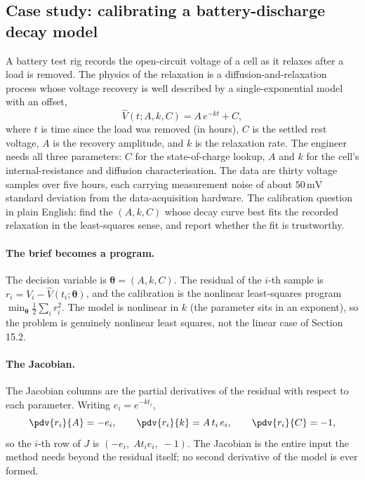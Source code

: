 \subsection{Case study: calibrating a battery-discharge decay model}

A battery test rig records the open-circuit voltage of a cell as it
relaxes after a load is removed. The physics of the relaxation is a
diffusion-and-relaxation process whose voltage recovery is well
described by a single-exponential model with an offset,
\[
\hat{V}(t; A, k, C) = A \, e^{-k t} + C,
\]
where $t$ is time since the load was removed (in hours), $C$ is the
settled rest voltage, $A$ is the recovery amplitude, and $k$ is the
relaxation rate. The engineer needs all three parameters: $C$ for the
state-of-charge lookup, $A$ and $k$ for the cell's internal-resistance
and diffusion characterisation. The data are thirty voltage samples
over five hours, each carrying measurement noise of about
$50\,\si{\milli\volt}$ standard deviation from the data-acquisition
hardware. The calibration question in plain English: find the
$(A, k, C)$ whose decay curve best fits the recorded relaxation in the
least-squares sense, and report whether the fit is trustworthy.

\paragraph{The brief becomes a program.}
The decision variable is $\boldsymbol{\theta} = (A, k, C)$. The
residual of the $i$-th sample is $r_{i} = V_{i} - \hat{V}(t_{i};
\boldsymbol{\theta})$, and the calibration is the nonlinear
least-squares program $\min_{\boldsymbol{\theta}} \tfrac{1}{2}
\sum_{i} r_{i}^{2}$. The model is nonlinear in $k$ (the parameter sits
in an exponent), so the problem is genuinely nonlinear least squares,
not the linear case of Section 15.2.

\paragraph{The Jacobian.}
The Jacobian columns are the partial derivatives of the residual with
respect to each parameter. Writing $e_{i} = e^{-k t_{i}}$,
\[
\pdv{r_{i}}{A} = -e_{i}, \qquad
\pdv{r_{i}}{k} = A \, t_{i} \, e_{i}, \qquad
\pdv{r_{i}}{C} = -1,
\]
so the $i$-th row of $J$ is $(-e_{i}, \; A t_{i} e_{i}, \; -1)$. The
Jacobian is the entire input the method needs beyond the residual
itself; no second derivative of the model is ever formed.

